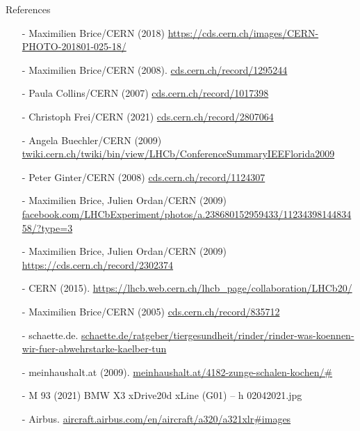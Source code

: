 \begin{frame}{References}\scriptsize
\begin{itemize}
\item[-] Maximilien Brice/CERN (2018) \url{https://cds.cern.ch/images/CERN-PHOTO-201801-025-18/} 
\item[-] Maximilien Brice/CERN (2008). \url{cds.cern.ch/record/1295244}
\item[-] Paula Collins/CERN (2007)  \url{cds.cern.ch/record/1017398}
\item[-] Christoph Frei/CERN (2021)  \url{cds.cern.ch/record/2807064}
\item[-] Angela Buechler/CERN (2009)  \url{twiki.cern.ch/twiki/bin/view/LHCb/ConferenceSummaryIEEFlorida2009}
\item[-] Peter Ginter/CERN (2008) \url{cds.cern.ch/record/1124307}
\item[-] Maximilien Brice, Julien Ordan/CERN (2009)  \url{facebook.com/LHCbExperiment/photos/a.238680152959433/1123439814483458/?type=3}
\item[-] Maximilien Brice, Julien Ordan/CERN (2009)  \url{https://cds.cern.ch/record/2302374}
\item[-] CERN (2015). \url{https://lhcb.web.cern.ch/lhcb_page/collaboration/LHCb20/ }
\item[-] Maximilien Brice/CERN (2005)  \url{cds.cern.ch/record/835712}
\item[-] schaette.de. \url{schaette.de/ratgeber/tiergesundheit/rinder/rinder-was-koennen-wir-fuer-abwehrstarke-kaelber-tun}
\item[-] meinhaushalt.at (2009). \url{meinhaushalt.at/4182-zunge-schalen-kochen/#}
\item[-] M 93 (2021) BMW X3 xDrive20d xLine (G01) – h 02042021.jpg
\item[-] Airbus. \url{aircraft.airbus.com/en/aircraft/a320/a321xlr#images}
\end{itemize}
\end{frame}
